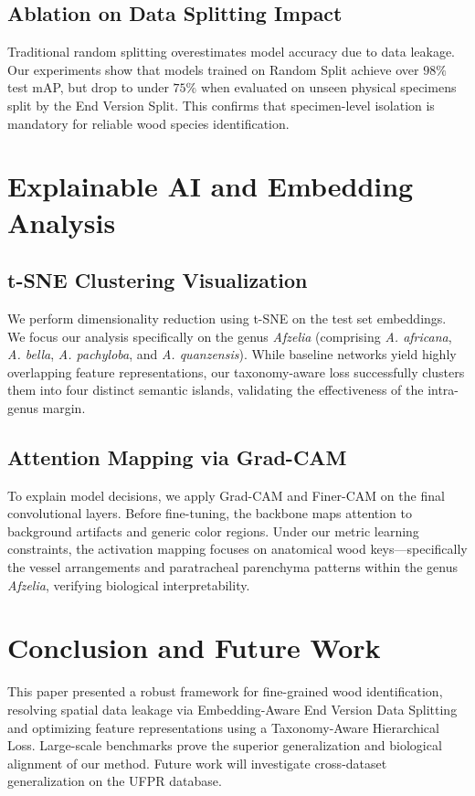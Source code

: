 \documentclass[journal,onecolumn]{IEEEtran}
\begin{document}
\subsection{Ablation on Data Splitting Impact}
Traditional random splitting overestimates model accuracy due to data leakage. Our experiments show that models trained on Random Split achieve over $98\%$ test mAP, but drop to under $75\%$ when evaluated on unseen physical specimens split by the End Version Split. This confirms that specimen-level isolation is mandatory for reliable wood species identification.

\section{Explainable AI and Embedding Analysis}

\subsection{t-SNE Clustering Visualization}
We perform dimensionality reduction using t-SNE on the test set embeddings. We focus our analysis specifically on the genus \textit{Afzelia} (comprising \textit{A. africana}, \textit{A. bella}, \textit{A. pachyloba}, and \textit{A. quanzensis}). While baseline networks yield highly overlapping feature representations, our taxonomy-aware loss successfully clusters them into four distinct semantic islands, validating the effectiveness of the intra-genus margin.

\subsection{Attention Mapping via Grad-CAM}
To explain model decisions, we apply Grad-CAM and Finer-CAM on the final convolutional layers. Before fine-tuning, the backbone maps attention to background artifacts and generic color regions. Under our metric learning constraints, the activation mapping focuses on anatomical wood keys—specifically the vessel arrangements and paratracheal parenchyma patterns within the genus \textit{Afzelia}, verifying biological interpretability.

\section{Conclusion and Future Work}
This paper presented a robust framework for fine-grained wood identification, resolving spatial data leakage via Embedding-Aware End Version Data Splitting and optimizing feature representations using a Taxonomy-Aware Hierarchical Loss. Large-scale benchmarks prove the superior generalization and biological alignment of our method. Future work will investigate cross-dataset generalization on the UFPR database.
\end{document}
